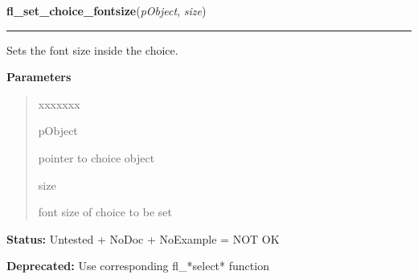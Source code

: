 \hspace{.8\funcindent}\begin{boxedminipage}{\funcwidth}

    \raggedright \textbf{fl\_set\_choice\_fontsize}(\textit{pObject}, \textit{size})

    \vspace{-1.5ex}

    \rule{\textwidth}{0.5\fboxrule}
\setlength{\parskip}{2ex}
    Sets the font size inside the choice.

\setlength{\parskip}{1ex}
      \textbf{Parameters}
      \vspace{-1ex}

      \begin{quote}
        \begin{Ventry}{xxxxxxx}

          \item[pObject]

          pointer to choice object

          \item[size]

          font size of choice to be set

        \end{Ventry}

      \end{quote}

\textbf{Status:} Untested + NoDoc + NoExample = NOT OK



\textbf{Deprecated:} Use corresponding fl\_*select* function



    \end{boxedminipage}

    \label{xformslib:deprecated:fl_set_choice_fontstyle}

    \vspace{0.5ex}

